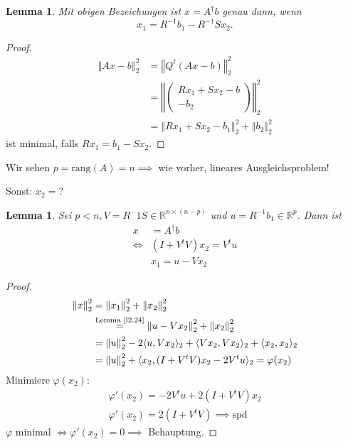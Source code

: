 \documentclass{book}
\newtheorem{lemma}[algorithm]{Lemma}
\def\R{\mathbb{R}}
\def\rang{\text{rang}}
\begin{document}
            \begin{lemma}\label{l2.24}
                Mit obigen Bezeichungen ist $x=A^\dagger b$ genau dann, wenn \[x_1=R^{-1}b_1-R^{-1}Sx_2.\]
            \end{lemma}
            \begin{proof}
                \begin{align*}
                    \left\Vert Ax-b \right\Vert_2^2&=\left\Vert Q^t(Ax-b) \right\Vert_2^2\\
                    &=\left\Vert \begin{pmatrix}
                        Rx_1+Sx_2-b\\
                        -b_2
                    \end{pmatrix} \right\Vert_2^2\\
                    &= \left\Vert Rx_1+Sx_2 -b_1\right\Vert_2^2+\left\Vert b_2 \right\Vert_2^2
                \end{align*}
                ist minimal, falls $Rx_1=b_1-Sx_2$.
            \end{proof}

            Wir sehen $p=\rang(A)=n\implies$ wie vorher, lineares Ausgleichsproblem!

            Sonst: $x_2=$?

            \begin{lemma}\label{l2.25}
                Sei $p<n,V=R^-1S\in\R^{n\times (n-p)}$ und $u=R^{-1}b_1\in\R^p$. Dann ist
                \begin{align*}
                    x&=A^\dagger b\\
                    \iff &(I+V^tV)x_2=V^tu\\
                    &x_1=u-Vx_2
                \end{align*}
            \end{lemma}

            \begin{proof}
                \begin{align*}
                    \left\Vert x \right\Vert_2^2 &= \left\Vert x_1 \right\Vert_2^2 + \left\Vert x_2 \right\Vert_2^2\\
                    &\stackrel{\text{Lemma \ref{l2.24}}}{=}\left\Vert u-Vx_2 \right\Vert_2^2+ \left\Vert x_2 \right\Vert_2^2\\
                    &=\left\Vert u \right\Vert_2^2-2 \langle u,Vx_2 \rangle_2+\langle Vx_2,Vx_2 \rangle_2+\langle x_2,x_2 \rangle_2\\
                    &=\left\Vert u \right\Vert_2^2+\langle x_2,(I+V^tV)x_2-2V^tu \rangle_2 = \varphi(x_2)
                \end{align*}
                Minimiere $\varphi(x_2)$:
                \begin{align*}
                    \varphi'(x_2)=-2V^tu+2(I+V^tV)x_2\\
                    \varphi'(x_2)=2(I+V^tV) \implies \text{spd}
                \end{align*}
                $\varphi$ minimal $\iff \varphi'(x_2)=0\implies $ Behauptung.
            \end{proof}
\end{document}
